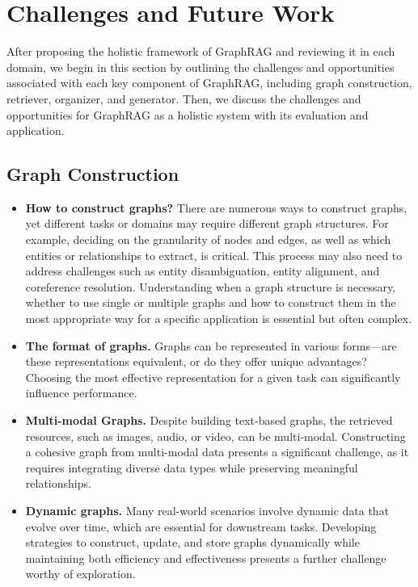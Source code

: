 \section{Challenges and Future Work}\label{sec-challenge}
After proposing the holistic framework of GraphRAG and reviewing it in each domain, we begin in this section by outlining the challenges and opportunities associated with each key component of GraphRAG, including graph construction, retriever, organizer, and generator. Then, we discuss the challenges and opportunities for GraphRAG as a holistic system with its evaluation and application. 

 \subsection{Graph Construction} 

 \begin{itemize}[leftmargin=*]
     \item \textbf{How to construct graphs?} There are numerous ways to construct graphs, yet different tasks or domains may require different graph structures. For example, deciding on the granularity of nodes and edges, as well as which entities or relationships to extract, is critical. This process may also need to address challenges such as entity disambiguation, entity alignment, and coreference resolution. Understanding when a graph structure is necessary, whether to use single or multiple graphs and how to construct them in the most appropriate way for a specific application is essential but often complex. \\
    
    \item \textbf{The format of graphs.} Graphs can be represented in various forms—are these representations equivalent, or do they offer unique advantages? Choosing the most effective representation for a given task can significantly influence performance. \\
    
    \item \textbf{Multi-modal Graphs.} Despite building text-based graphs, the retrieved resources, such as images, audio, or video, can be multi-modal. Constructing a cohesive graph from multi-modal data presents a significant challenge, as it requires integrating diverse data types while preserving meaningful relationships. \\
    
    \item \textbf{Dynamic graphs.} Many real-world scenarios involve dynamic data that evolve over time, which are essential for downstream tasks. Developing strategies to construct, update, and store graphs dynamically while maintaining both efficiency and effectiveness presents a further challenge worthy of exploration.
\end{itemize}

